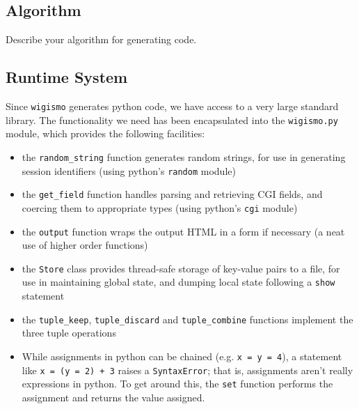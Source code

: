 \documentclass{WigReport}
\begin{document}
\subsection{Algorithm}
Describe your algorithm for generating code.

\subsection{Runtime System}
Since {\tt wigismo} generates python code, we have access to a very large
standard library. The functionality we need has been encapsulated into the
{\tt wigismo.py} module, which provides the following facilities:

\begin{itemize}
\item the {\tt random\_string} function generates random strings, for use
in generating session identifiers (using python's {\tt random} module) 
\item the {\tt get\_field} function handles parsing and retrieving CGI 
fields, and coercing them to appropriate types (using python's {\tt cgi}
module)
\item the {\tt output} function wraps the output HTML in a form if
necessary (a neat use of higher order functions)
\item the {\tt Store} class provides thread-safe storage of key-value pairs
to a file, for use in maintaining global state, and dumping local state
following a {\tt show} statement
\item the {\tt tuple\_keep}, {\tt tuple\_discard} and {\tt tuple\_combine}
functions implement the three tuple operations
\item While assignments in python can be chained (e.g. {\tt x = y = 4}), a
statement like {\tt x = (y = 2) + 3} raises a {\tt SyntaxError}; that is,
assignments aren't really expressions in python. To get around this, the
{\tt set} function performs the assignment and returns the value assigned.
\end{itemize}
\end{document}
